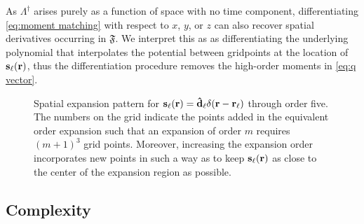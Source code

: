 As $\Lambda^\dagger$ arises purely as a function of space with no time component, differentiating \cref{eq:moment matching} with respect to $x$, $y$, or $z$ can also recover spatial derivatives occurring in $\mathfrak{F}$.
We interpret this as as differentiating the underlying polynomial that interpolates the potential between gridpoints at the location of $\vb{s}_\ell(\vb{r})$, thus the differentiation procedure removes the high-order moments in \cref{eq:q vector}.

\begin{figure}
  \centering
  \caption{\label{fig:expansion pattern}Spatial expansion pattern for $\vb{s}_\ell(\vb{r}) = \vu{d}_\ell \delta(\vb{r} - \vb{r}_\ell)$ through order five.
    The numbers on the grid indicate the points added in the equivalent order expansion such that an expansion of order $m$ requires $(m + 1)^3$ grid points.
    Moreover, increasing the expansion order incorporates new points in such a way as to keep $\vb{s}_\ell(\vb{r})$ as close to the center of the expansion region as possible.
  }
\end{figure}

\subsection{Complexity}

